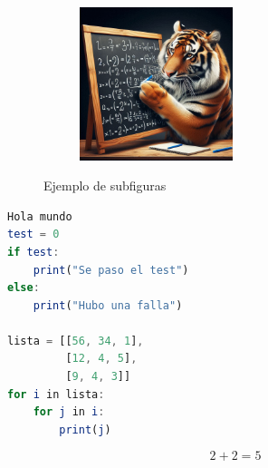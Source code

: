 \begin{figure}[H]
\begin{subfigure}[b]{0.49\textwidth}
        \caption{}
        \label{subfig:test5}
    \end{subfigure}
    \hfill
    \begin{subfigure}[b]{\textwidth}
        \centering
        \includegraphics[width = 0.49\textwidth]{imagenes/test2.jpeg}
        \caption{}
        \label{subfig:test6}
    \end{subfigure}
        \caption{Ejemplo de subfiguras}
        \label{fig:test2}
\end{figure}


\begin{table}[H]
  \centering
    \caption{Ejemplo}
  \label{tab:test}
\end{table}

\begin{lstlisting}[language=Octave,caption={Ejemplo}]
Hola mundo
test = 0
if test:
	print("Se paso el test")
else:
	print("Hubo una falla")
 
lista = [[56, 34, 1],
         [12, 4, 5],
         [9, 4, 3]]
for i in lista:
    for j in i:
        print(j)
\end{lstlisting}

\begin{equation}
    2 + 2 = 5
     \label{eq:test}
\end{equation}

